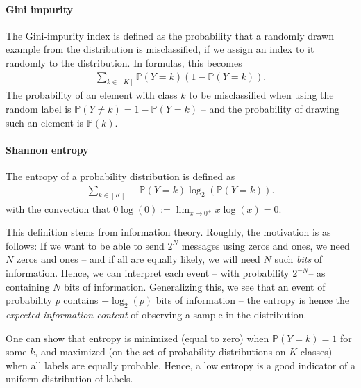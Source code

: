 \documentclass{article}
\begin{document}
\paragraph{Gini impurity} The Gini-impurity index is defined as the probability that a randomly drawn example from the distribution is misclassified, if we assign an index to it randomly to the distribution. In formulas, this becomes
\begin{align*}
    \sum_{k \in [K]} \mathbb{P}(Y=k)(1-\mathbb{P}(Y=k)).
\end{align*}
The probability of an element with class $k$ to be misclassified when using the random label is $\mathbb{P}(Y\neq k)=1-\mathbb{P}(Y=k)$ -- and the probability of drawing such an element is $\mathbb{P}(k)$.

\paragraph{Shannon entropy} The entropy of a probability distribution is defined as 
\begin{align*}
    \sum_{k \in [K]} -\mathbb{P}(Y=k)\log_2(\mathbb{P}(Y=k)).
\end{align*}
with the convection that $0\log(0) :=\lim_{x\to 0^+}x\log(x)=0$.

This definition stems from information theory. Roughly, the motivation is as follows: If we want to be able to send $2^N$ messages using zeros and ones, we need $N$ zeros and ones -- and if all are equally likely, we will need $N$ such \emph{bits} of information. Hence, we can interpret each event -- with probability $2^{-N}$-- as containing $N$ bits of information. Generalizing this, we see that an event of probability $p$ contains $-\log_2(p)$ bits of information -- the entropy is hence the \emph{expected information content} of observing a sample in the distribution.

One can show that entropy is minimized (equal to zero) when $\mathbb{P}(Y=k)=1$ for some $k$, and maximized (on the set of probability distributions on $K$ classes) when all labels are equally probable. Hence, a low entropy is a good indicator of a uniform distribution of labels.
\end{document}
